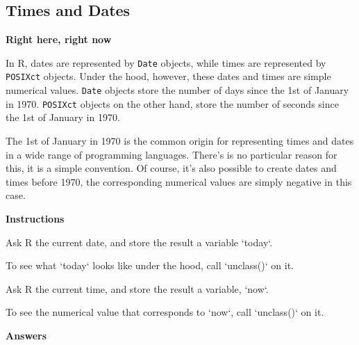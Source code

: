 \documentclass[]{article}
\newcommand{\hlstr}[1]{\textcolor[rgb]{0.251,0.627,0.251}{#1}}%
\newcommand{\hlstd}[1]{\textcolor[rgb]{0.251,0.251,0.251}{#1}}%
\newcommand{\hlkwc}[1]{\textcolor[rgb]{0.251,0.251,0.251}{#1}}%
\newenvironment{Shaded}{\begin{myshaded}}{\end{myshaded}}
\newcommand{\DataTypeTok}[1]{\hlkwc{#1}}
\newcommand{\StringTok}[1]{\hlstr{#1}}
\newcommand{\NormalTok}[1]{\hlstd{#1}}
\begin{document}
\subsection{Times and Dates}\label{times-and-dates}

\textbf{Right here, right now}

In R, dates are represented by \texttt{Date} objects, while times are
represented by \texttt{POSIXct} objects. Under the hood, however, these
dates and times are simple numerical values. \texttt{Date} objects store
the number of days since the 1st of January in 1970. \texttt{POSIXct}
objects on the other hand, store the number of seconds since the 1st of
January in 1970.

The 1st of January in 1970 is the common origin for representing times
and dates in a wide range of programming languages. There's is no
particular reason for this, it is a simple convention. Of course, it's
also possible to create dates and times before 1970, the corresponding
numerical values are simply negative in this case.

\textbf{Instructions}

\begin{Shaded}
\begin{Highlighting}[]

\OperatorTok{*}\StringTok{ }\NormalTok{Ask R }\NormalTok{ the current date, and store the result }\NormalTok{ a variable }\StringTok{`}\DataTypeTok{today}\StringTok{`}\NormalTok{.}

\OperatorTok{*}\StringTok{ }\NormalTok{To see what }\StringTok{`}\DataTypeTok{today}\StringTok{`}\NormalTok{ looks like under the hood, call }\StringTok{`}\DataTypeTok{unclass()}\StringTok{`}\NormalTok{ on it.}

\OperatorTok{*}\StringTok{ }\NormalTok{Ask R }\NormalTok{ the current time, and store the result }\NormalTok{ a variable, }\StringTok{`}\DataTypeTok{now}\StringTok{`}\NormalTok{.}

\OperatorTok{*}\StringTok{ }\NormalTok{To see the numerical value that corresponds to }\StringTok{`}\DataTypeTok{now}\StringTok{`}\NormalTok{, call }\StringTok{`}\DataTypeTok{unclass()}\StringTok{`}\NormalTok{ on it.}
\end{Highlighting}
\end{Shaded}

\textbf{Answers}
\end{document}

